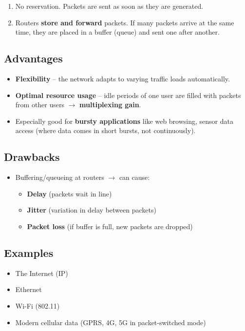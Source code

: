 \begin{enumerate}[label=\textbf{Step \arabic*}:]
    \item No reservation. Packets are sent as soon as they are generated.
    \item Routers \textbf{store and forward} packets. If many packets arrive at the same time, they are placed in a buffer (queue) and sent one after another.
\end{enumerate}

\subsection*{Advantages}
\begin{itemize}
    \item \textbf{Flexibility} – the network adapts to varying traffic loads automatically.
    \item \textbf{Optimal resource usage} – idle periods of one user are filled with packets from other users \(\rightarrow\) \textbf{multiplexing gain}.
    \item Especially good for \textbf{bursty applications} like web browsing, sensor data access (where data comes in short bursts, not continuously).
\end{itemize}

\subsection*{Drawbacks}
\begin{itemize}
    \item Buffering/queueing at routers \(\rightarrow\) can cause:
    \begin{itemize}
        \item \textbf{Delay} (packets wait in line)
        \item \textbf{Jitter} (variation in delay between packets)
        \item \textbf{Packet loss} (if buffer is full, new packets are dropped)
    \end{itemize}
\end{itemize}

\subsection*{Examples}
\begin{itemize}
    \item The Internet (IP)
    \item Ethernet
    \item Wi-Fi (802.11)
    \item Modern cellular data (GPRS, 4G, 5G in packet-switched mode)
\end{itemize}

